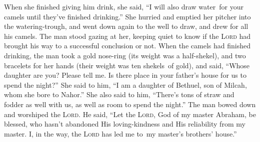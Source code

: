 \begin{inparaenum}
   When she finished giving him drink, she said, ``I will also draw water\understood\ for your camels until they've finished drinking.''%
   She hurried and emptied her pitcher into the watering-trough, and went down again to the well to draw, and drew for all his camels.%
   The man stood gazing at her, keeping quiet to know if the \textsc{Lord} had brought his way to a successful conclusion or not.%
   When the camels had finished drinking, the man took a gold nose-ring (its weight was a half-shekel), and two bracelets for her hands (their weight was ten shekels\understood\ of gold),%
   and said, ``Whose daughter are you? Please tell me. Is there place in your father's house for us to spend the night?''%
   She said to him, ``I am a daughter of Bethuel, son of Milcah, whom she bore to Nahor.''%
   She also said to him, ``There's tons of straw and fodder as well with us, as well as room to spend the night.''%
   The man bowed down and worshiped the \textsc{Lord}.%
   He said, ``Let the \textsc{Lord}, God of my master Abraham, be blessed, who hasn't abandoned His loving-kindness and His reliability from my master. I, in the way, the \textsc{Lord} has led me to\understood\ my master's brothers' house.''%
  

\end{inparaenum}
